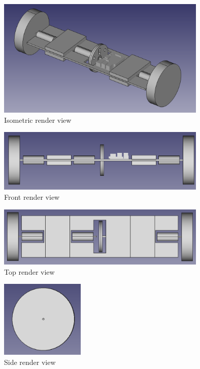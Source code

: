 \begin{figure}
	\centering
	\includegraphics[width=10cm]{img/isometric_view.png}
	\caption{Isometric render view}
	\label{fig:Isometric render view}
\end{figure}
\begin{figure}
	\centering
	\includegraphics[width=10cm]{img/front_view.png}
	\caption{Front render view}
	\label{fig:Front render view}
\end{figure}
\begin{figure}
	\centering
	\includegraphics[width=10cm]{img/top_view.png}
	\caption{Top render view}
	\label{fig:Top render view}
\end{figure}
\begin{figure}
	\centering
	\includegraphics[width=4cm]{img/side_view.png}
	\caption{Side render view}
	\label{fig:Side render view}
\end{figure}


